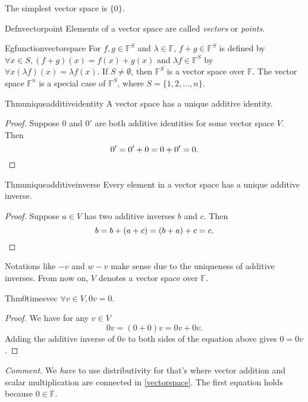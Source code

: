The simplest vector space is $\{0\}$.

\begin{reference}{Defn}{vectorpoint}
  Elements of a vector space are called \textit{vectors} or \textit{points}.
\end{reference}

\begin{reference}{Eg}{functionvectorspace}
  For $f,g\in \mathbb F^S$ and $\lambda\in \mathbb F$, $f+g\in \mathbb F^S$ is defined by $\forall x\in S, (f+g)(x)=f(x)+g(x)$ and $\lambda f\in \mathbb F^S$ by $\forall x(\lambda f)(x)=\lambda f(x)$. If $S\neq\emptyset$, then $\mathbb F^S$ is a vector space over $\mathbb F$. The vector space $\mathbb F^n$ is a special case of $\mathbb F^S$, where $S=\{1,2,\dots,n\}$.
\end{reference}

\begin{reference}{Thm}{uniqueadditiveidentity}
  A vector space has a unique additive identity.
\end{reference}

\begin{proof}
  Suppose 0 and $0'$ are both additive identities for some vector space $V$. Then
  \[
    0'=0'+0=0+0'=0.\qedhere
  \]
\end{proof}

\begin{reference}{Thm}{uniqueadditiveinverse}
  Every element in a vector space has a unique additive inverse.
\end{reference}

\begin{proof}
  Suppose $a\in V$ has two additive inverses $b$ and $c$. Then
  \[
    b=b+(a+c)=(b+a)+c=c.\qedhere
  \]
\end{proof}

Notations like $-v$ and $w-v$ make sense due to the uniqueness of additive inverses. From now on, $V$ denotes a vector space over $\mathbb F$.

\begin{reference}{Thm}{0timesvec}
  $\forall v\in V, 0v=0.$
\end{reference}

\begin{proof}
  We have for any $v\in V$
  \[
    0v=(0+0)v=0v+0v.
  \]
  Adding the additive inverse of $0v$ to both sides of the equation above gives $0=0v$.
\end{proof}

\textit{Comment.} We \textit{have} to use distributivity for that's where vector addition and scalar multiplication are connected in \ref{vectorspace}. The first equation holds because $0\in \mathbb F$.

